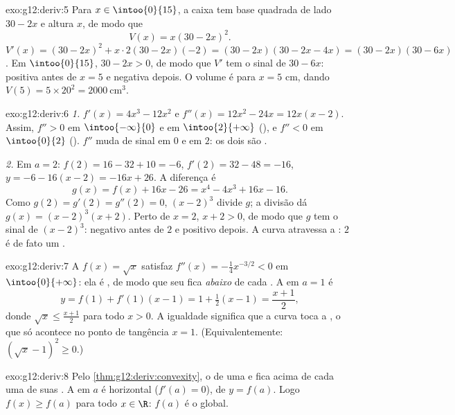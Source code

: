 \begin{solution}{exo:g12:deriv:5}
Para $x \in \intoo{0}{15}$, a caixa tem base quadrada de lado $30 - 2x$ e
altura $x$, de modo que
\[
V(x) = x(30 - 2x)^2 .
\]
$V'(x) = (30-2x)^2 + x \cdot 2(30-2x)(-2) = (30-2x)(30 - 2x - 4x)
= (30-2x)(30-6x)$. Em $\intoo{0}{15}$, $30 - 2x > 0$, de modo que $V'$ tem
o sinal de $30 - 6x$: positiva antes de $x = 5$ e negativa depois. O
volume é  para $x = 5$ cm, dando
$V(5) = 5 \times 20^2 = 2000\ \text{cm}^3$.
\end{solution}

\begin{solution}{exo:g12:deriv:6}
\emph{1.} $f'(x) = 4x^3 - 12x^2$ e $f''(x) = 12x^2 - 24x = 12x(x-2)$.
Assim, $f'' > 0$ em $\intoo{-\infty}{0}$ e em $\intoo{2}{+\infty}$
(), e $f'' < 0$ em $\intoo{0}{2}$ (). $f''$ muda de sinal em
$0$ e em $2$: os dois são .

\emph{2.} Em $a = 2$: $f(2) = 16 - 32 + 10 = -6$,
$f'(2) = 32 - 48 = -16$,  $y = -6 - 16(x-2) = -16x + 26$. A
diferença é
\[
g(x) = f(x) + 16x - 26 = x^4 - 4x^3 + 16x - 16 .
\]
Como $g(2) = g'(2) = g''(2) = 0$, $(x-2)^3$ divide $g$; a divisão dá
$g(x) = (x-2)^3(x+2)$. Perto de $x = 2$, $x + 2 > 0$, de modo que $g$ tem
o sinal de $(x-2)^3$: negativo antes de $2$ e positivo depois. A curva
atravessa a : $2$ é de fato um .
\end{solution}

\begin{solution}{exo:g12:deriv:7}
A  $f(x) = \sqrt{x}$ satisfaz $f''(x) = -\frac{1}{4}x^{-3/2} < 0$ em
$\intoo{0}{+\infty}$: ela é , de modo que seu  fica
\emph{abaixo} de cada . A  em $a = 1$ é
\[
y = f(1) + f'(1)(x - 1) = 1 + \tfrac12 (x-1) = \frac{x+1}{2},
\]
donde $\sqrt{x} \leq \frac{x+1}{2}$ para todo $x > 0$. A igualdade
significa que a curva toca a , o que só acontece no ponto de
tangência $x = 1$. (Equivalentemente:
$\left(\sqrt x - 1\right)^2 \geq 0$.)
\end{solution}

\begin{solution}{exo:g12:deriv:8}
Pelo \cref{thm:g12:deriv:convexity}, o  de uma   e
 fica acima de cada uma de suas . A  em $a$ é
horizontal ($f'(a) = 0$), de  $y = f(a)$. Logo $f(x) \geq f(a)$
para todo $x \in \R$: $f(a)$ é o  global.
\end{solution}

